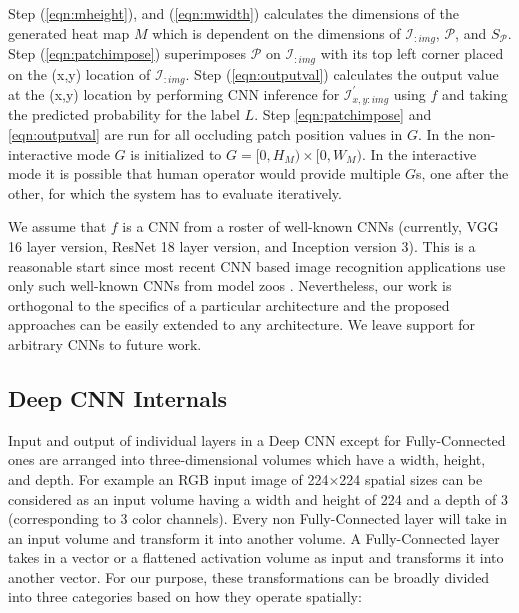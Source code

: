 Step (\ref{eqn:mheight}), and (\ref{eqn:mwidth}) calculates the dimensions of the generated heat map $M$ which is dependent on the dimensions of $\mathcal{I}_{:img}$, $\mathcal{P}$, and $S_\mathcal{P}$.
Step (\ref{eqn:patchimpose}) superimposes $\mathcal{P}$ on $\mathcal{I}_{:img}$ with its top left corner placed on the (x,y) location of $\mathcal{I}_{:img}$.
Step (\ref{eqn:outputval}) calculates the output value at the (x,y) location by performing CNN inference for $\mathcal{I}^{'}_{x,y:img}$ using $f$ and taking the predicted probability for the label $L$.
Step \ref{eqn:patchimpose} and \ref{eqn:outputval} are run for all occluding patch position values in $G$.
In the non-interactive mode $G$ is initialized to $G = [0, H_M) \times [0, W_M)$.
In the interactive mode it is possible that human operator would provide multiple $G$s, one after the other, for which the system has to evaluate iteratively.

We assume that $f$ is a CNN from a roster of well-known CNNs (currently, VGG 16 layer version, ResNet 18 layer version, and Inception version 3).
This is a reasonable start since most recent CNN based image recognition applications use only such well-known CNNs from model zoos \cite{caffemodelzoo, tfmodelzoo}.
Nevertheless, our work is orthogonal to the specifics of a particular architecture and the proposed approaches can be easily extended to any architecture.
We leave support for arbitrary CNNs to future work.

\subsection{Deep CNN Internals}
Input and output of individual layers in a Deep CNN except for Fully-Connected ones are arranged into three-dimensional volumes which have a width, height, and depth.
For example an RGB input image of 224$\times$224 spatial sizes can be considered as an input volume having a width and height of 224 and a depth of 3 (corresponding to 3 color channels).
Every non Fully-Connected layer will take in an input volume and transform it into another volume.
A Fully-Connected layer takes in a vector or a flattened activation volume as input and transforms it into another vector.
For our purpose, these transformations can be broadly divided into three categories based on how they operate spatially:

